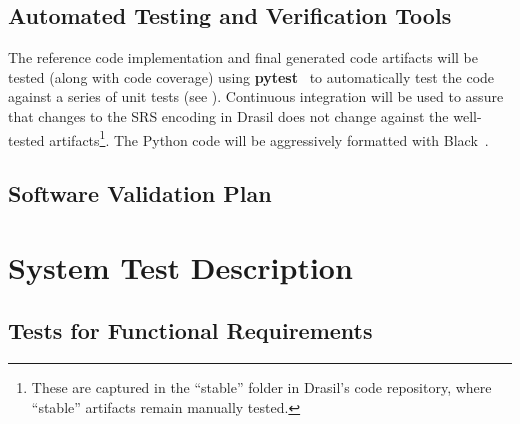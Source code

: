 \documentclass[12pt, titlepage]{article}
\begin{document}
\subsection{Automated Testing and Verification Tools}

The reference code implementation and final generated code artifacts will be
tested (along with code coverage) using \textbf{pytest}~\cite{PyTest} to
automatically test the code against a series of unit tests (see
). Continuous integration will be used to assure
that changes to the SRS encoding in Drasil does not change against the
well-tested artifacts\footnote{These are captured in the ``stable'' folder in
    Drasil's code repository, where ``stable'' artifacts remain manually tested.}.
The Python code will be aggressively formatted with Black~\cite{PythonBlack}.

\subsection{Software Validation Plan}





\newpage{}

\section{System Test Description}

\subsection{Tests for Functional Requirements}

\end{document}
